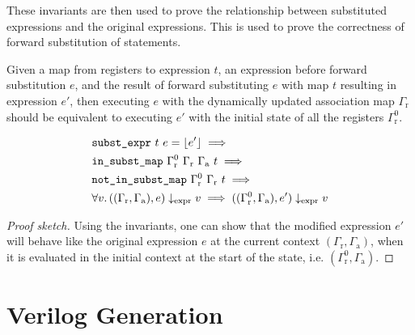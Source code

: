 These invariants are then used to prove the relationship between substituted
expressions and the original expressions.  This is used to prove the correctness
of forward substitution of statements.

\begin{lemma}%
  \label{lem:hg:forward-substitution-of-expressions}

  Given a map from registers to expression $t$, an expression before forward
  substitution $e$, and the result of forward substituting $e$ with map $t$
  resulting in expression $e'$, then executing $e$ with the dynamically updated
  association map $\Gamma_{\mathrm r}$ should be equivalent to executing $e'$
  with the initial state of all the registers $\Gamma^{0}_{\mathrm r}$.

  {\normalfont
    \begin{equation}
      \begin{aligned}
        &\texttt{subst\_expr}\ t\ e = \lfloor e' \rfloor \implies \\
        &\texttt{in\_subst\_map}\ \Gamma^{0}_{\mathrm r}\ \Gamma_{\mathrm r}\ \Gamma_{\mathrm a}\ t \implies\\
        &\texttt{not\_in\_subst\_map}\ \Gamma^{0}_{\mathrm r}\ \Gamma_{\mathrm r}\ t \implies\\
        &\forall v\ldotp ((\Gamma_{\mathrm r}, \Gamma_{\mathrm a}), e) \downarrow_{\text{expr}} v
          \implies ((\Gamma^{0}_{\mathrm r}, \Gamma_{\mathrm a}), e') \downarrow_{\text{expr}} v
      \end{aligned}
    \end{equation}}

  \begin{proof}[Proof sketch]
    Using the invariants, one can show that the modified expression $e'$ will
    behave like the original expression $e$ at the current context
    $(\Gamma_{\mathrm r}, \Gamma_{\mathrm a})$, when it is evaluated in the
    initial context at the start of the state, i.e.
    $(\Gamma^{0}_{\mathrm r}, \Gamma_{\mathrm a})$.
  \end{proof}
\end{lemma}


\section{Verilog Generation}%
\label{sec:hg:verilog-generation}

